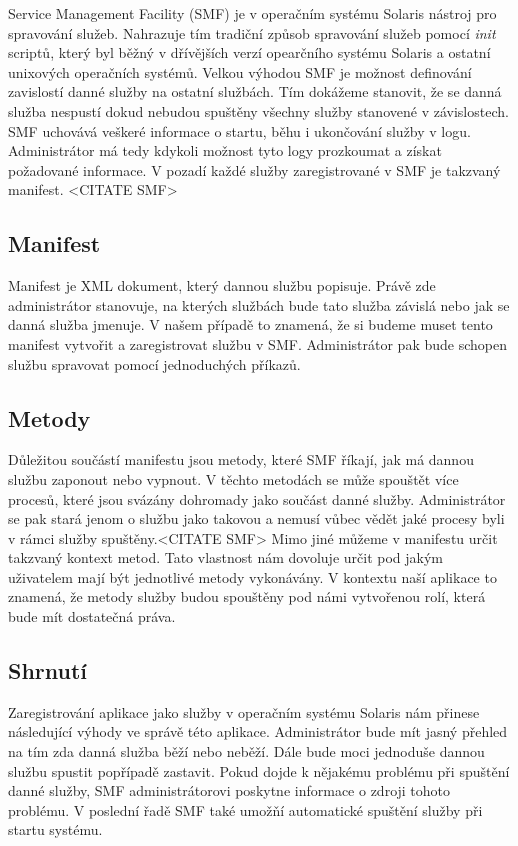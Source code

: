 Service Management Facility (SMF) je v operačním systému Solaris nástroj pro spravování služeb. Nahrazuje tím tradiční způsob spravování služeb pomocí \emph{init} scriptů, který byl běžný v dřívějších verzí opearčního systému Solaris a ostatní unixových operačních systémů. Velkou výhodou SMF je možnost definování zavislostí danné služby na ostatní službách. Tím dokážeme stanovit, že se danná služba nespustí dokud nebudou spuštěny všechny služby stanovené v závislostech. SMF uchovává veškeré informace o startu, běhu i ukončování služby v logu. Administrátor má tedy kdykoli možnost tyto logy prozkoumat a získat požadované informace. V pozadí každé služby zaregistrované v SMF je takzvaný manifest. <CITATE SMF>
    \subsection{Manifest}
    Manifest je XML dokument, který dannou službu popisuje. Právě zde administrátor stanovuje, na kterých službách bude tato služba závislá nebo jak se danná služba jmenuje. V našem případě to znamená, že si budeme muset tento manifest vytvořit a zaregistrovat službu v SMF. Administrátor pak bude schopen službu spravovat pomocí jednoduchých příkazů.
    \subsection{Metody}
    Důležitou součástí manifestu jsou metody, které SMF říkají, jak má dannou službu zaponout nebo vypnout. V těchto metodách se může spouštět více procesů, které jsou svázány dohromady jako součást danné služby. Administrátor se pak stará jenom o službu jako takovou a nemusí vůbec vědět jaké procesy byli v rámci služby spuštěny.<CITATE SMF> Mimo jiné můžeme v manifestu určit takzvaný kontext metod. Tato vlastnost nám dovoluje určit pod jakým uživatelem mají být jednotlivé metody vykonávány. V kontextu naší aplikace to znamená, že metody služby budou spouštěny pod námi vytvořenou rolí, která bude mít dostatečná práva.
    \subsection{Shrnutí}
    Zaregistrování aplikace jako služby v operačním systému Solaris nám přinese následující výhody ve správě této aplikace. Administrátor bude mít jasný přehled na tím zda danná služba běží nebo neběží. Dále bude moci jednoduše dannou službu spustit popřípadě zastavit. Pokud dojde k nějakému problému při spuštění danné služby, SMF administrátorovi poskytne informace o zdroji tohoto problému. V poslední řadě SMF také umožňí automatické spuštění služby při startu systému.
    

